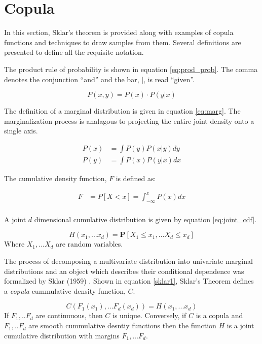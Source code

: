 \section{Copula}

In this section, Sklar's theorem is provided along with examples of copula functions
and techniques to draw samples from them.  Several definitions are presented
to define all the requisite notation.

The product rule of probability is shown in equation \ref{eq:prod_prob}.  The comma denotes the conjunction
``and'' and the bar, $|$, is read ``given''.

\begin{equation}
P(x, y) = P(x) \cdot P(y | x)
\label{eq:prod_prob}
\end{equation}

The definition of a marginal distribution is given in equation \ref{eq:marg}.  The marginalization process is analagous to projecting the entire joint density onto a single axis. 

\begin{align*}
P(x) &= \int P(y) P(x|y) dy \\ P(y) &= \int P(x) P(y|x) dx
\label{eq:marg}
\end{align*}

The cumulative density function, $F$ is defined as:

\begin{align*} 
F &= P[X < x] = \int_{-\infty}^x P(x)dx \\
\end{align*}

A joint $d$ dimensional cumulative distribution is given by equation \ref{eq:joint_cdf}.

\begin{equation}
H(x_1, ... x_d) = \mathbf P[X_1 \leq x_1, ... X_d \leq x_d]
\label{eq:joint_cdf}
\end{equation}
Where $X_1, ... X_d$ are random variables.

The process of decomposing a multivariate distribution into univariate marginal
distributions and an object which describes their conditional dependence was
formalized by Sklar (1959) \cite{Sklar1959}.  Shown in equation \ref{sklar1},  Sklar's Theorem
defines a \emph{copula} cummulative density function, $C$.

\begin{equation}
C(F_1(x_1), ... F_d(x_d)) = H(x_1, ... x_d)
\label{sklar1}
\end{equation}
If $F_1, .. F_d$ are continuuous, then $C$ is unique.  Conversely, if $C$ is a copula and $F_1, .. F_d$ are smooth cummulative desntiy functions then the function $H$ is a joint cumulative distribution with margins $F_1, ... F_d$.

